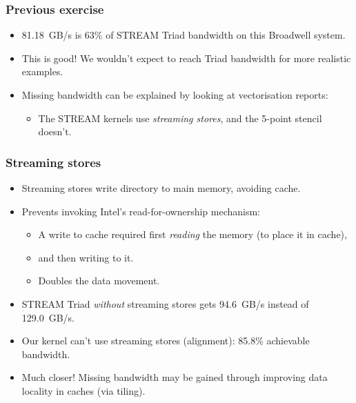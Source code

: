 \documentclass{beamer}
\begin{document}
\begin{frame}
\frametitle{Previous exercise}

\begin{itemize}
  \item 81.18~GB/s is 63\% of STREAM Triad bandwidth on this Broadwell system.
  \item This is good! We wouldn't expect to reach Triad bandwidth for more realistic examples.
  \item Missing bandwidth can be explained by looking at vectorisation reports:
  \begin{itemize}
    \item The STREAM kernels use \emph{streaming stores}, and the 5-point stencil doesn't.
  \end{itemize}
\end{itemize}

\end{frame}

\begin{frame}
\frametitle{Streaming stores}

\begin{itemize}
  \item Streaming stores write directory to main memory, avoiding cache.
  \item Prevents invoking Intel's read-for-ownership mechanism:
  \begin{itemize}
    \item A write to cache required first \emph{reading} the memory (to place it in cache),
    \item and then writing to it.
    \item Doubles the data movement.
  \end{itemize}

\vfill
\pause

  \item STREAM Triad \emph{without} streaming stores gets 94.6~GB/s instead of 129.0~GB/s.
  \item Our kernel can't use streaming stores (alignment): 85.8\% achievable bandwidth.

\vfill
\pause

  \item Much closer! Missing bandwidth may be gained through improving data locality in caches (via tiling).
\end{itemize}

\end{frame}
\end{document}
